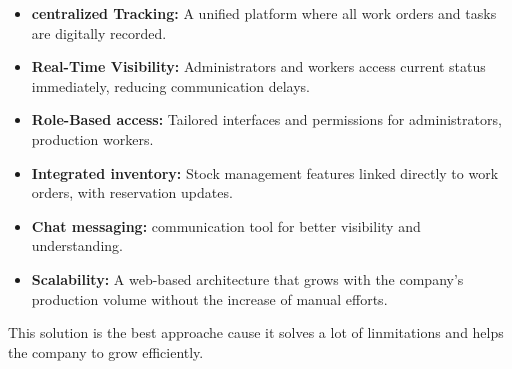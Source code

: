 \begin{itemize}
    \item \textbf{centralized Tracking:} A unified platform where all work orders and tasks are digitally recorded.
    \item \textbf{Real-Time Visibility:} Administrators and workers access current status immediately, reducing communication delays.
    \item \textbf{Role-Based access:} Tailored interfaces and permissions for administrators, production workers.
    \item \textbf{Integrated inventory:} Stock management features linked directly to work orders, with reservation updates.
    \item \textbf{Chat messaging:} communication tool for better visibility and understanding.
    \item \textbf{Scalability:} A web-based architecture that grows with the company's production volume without the increase of manual efforts.
\end{itemize}
This solution is the best approache cause it solves a lot of linmitations and helps the company to grow efficiently.

